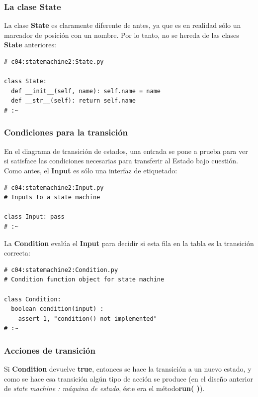 \documentclass{article}
\begin{document}
 \subsubsection{La clase State}
  
 La clase \textbf{State} es claramente diferente de antes, ya que es en realidad sólo un marcador de posición con un nombre. Por lo tanto, no se hereda de las clases \textbf{State} anteriores:    \newline
 
 \begin{lstlisting}
# c04:statemachine2:State.py 

class State: 
  def __init__(self, name): self.name = name 
  def __str__(self): return self.name  
# :~  
 \end{lstlisting}
  
  \subsubsection{Condiciones para la transición}

En el diagrama de transición de estados, una entrada se pone a prueba para ver si satisface las condiciones necesarias para transferir al Estado bajo cuestión. Como antes, el \textbf{Input} es sólo una interfaz de etiquetado:     \newline

\begin{lstlisting}
# c04:statemachine2:Input.py 
# Inputs to a state machine 

class Input: pass 
# :~ 
\end{lstlisting}

La \textbf{Condition} evalúa el \textbf{Input} para decidir si esta fila en la tabla es la transición correcta: \newline

  \begin{lstlisting}
# c04:statemachine2:Condition.py 
# Condition function object for state machine 

class Condition: 
  boolean condition(input) :  
    assert 1, "condition() not implemented" 
# :~ 
\end{lstlisting}

\subsubsection{Acciones de transición}

Si \textbf{Condition} devuelve \textbf{true}, entonces se hace la transición a un nuevo estado, y como se hace esa transición algún tipo de acción se produce (en el diseño anterior de \textit{state machine : máquina de estado}, éste era el método\textbf{run( )}).     \newline
\end{document}

